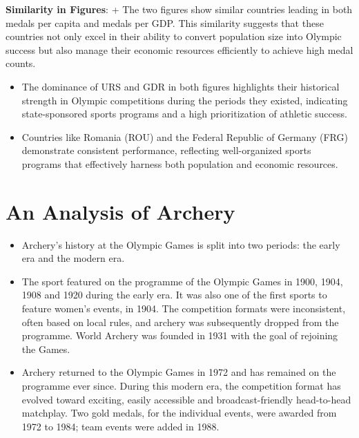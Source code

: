 \documentclass[12pt,preprint, authoryear]{elsarticle}
\numberwithin{equation}{section}
\numberwithin{figure}{section}
\numberwithin{table}{section}
\begin{document}
\textbf{Similarity in Figures}: + The two figures show similar countries
leading in both medals per capita and medals per GDP. This similarity
suggests that these countries not only excel in their ability to convert
population size into Olympic success but also manage their economic
resources efficiently to achieve high medal counts.

\begin{itemize}
\item
  The dominance of URS and GDR in both figures highlights their
  historical strength in Olympic competitions during the periods they
  existed, indicating state-sponsored sports programs and a high
  prioritization of athletic success.
\item
  Countries like Romania (ROU) and the Federal Republic of Germany (FRG)
  demonstrate consistent performance, reflecting well-organized sports
  programs that effectively harness both population and economic
  resources.
\end{itemize}

\hypertarget{an-analysis-of-archery}{%
\section{An Analysis of Archery}\label{an-analysis-of-archery}}

\begin{itemize}
\item
  Archery's history at the Olympic Games is split into two periods: the
  early era and the modern era.
\item
  The sport featured on the programme of the Olympic Games in 1900,
  1904, 1908 and 1920 during the early era. It was also one of the first
  sports to feature women's events, in 1904. The competition formats
  were inconsistent, often based on local rules, and archery was
  subsequently dropped from the programme. World Archery was founded in
  1931 with the goal of rejoining the Games.
\item
  Archery returned to the Olympic Games in 1972 and has remained on the
  programme ever since. During this modern era, the competition format
  has evolved toward exciting, easily accessible and broadcast-friendly
  head-to-head matchplay. Two gold medals, for the individual events,
  were awarded from 1972 to 1984; team events were added in 1988.
\end{itemize}
\end{document}
